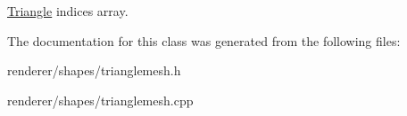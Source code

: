 \hyperlink{structembree_1_1_triangle_mesh_1_1_triangle}{Triangle} indices array. 



The documentation for this class was generated from the following files:\begin{DoxyCompactItemize}
\item 
renderer/shapes/trianglemesh.h\item 
renderer/shapes/trianglemesh.cpp\end{DoxyCompactItemize}
